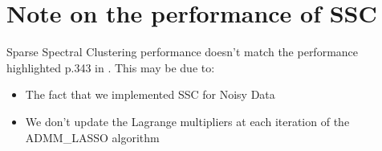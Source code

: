\documentclass[a4paper, 11pt]{article}
\begin{document}
\newpage
\section{Note on the performance of SSC}
Sparse Spectral Clustering performance doesn't match the performance highlighted p.343 in \cite{vidal16}. This may be due to:
\begin{itemize}
    \item The fact that we implemented SSC for Noisy Data
    \item We don't update the Lagrange multipliers at each iteration of the ADMM\_LASSO algorithm
\end{itemize}

\newpage
\printbibliography

\end{document}

